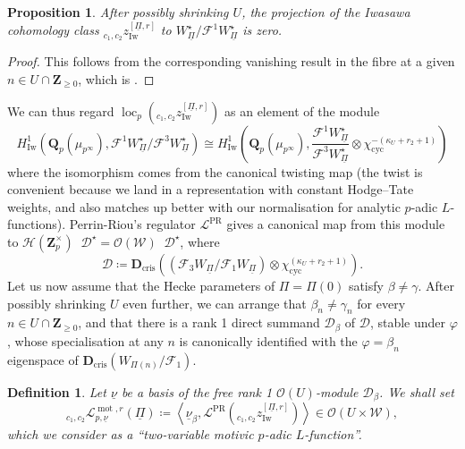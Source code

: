 \documentclass[cjm]{ipart}
\theoremstyle{plain}
\newtheorem{proposition}[theorem]{Proposition}
\newtheorem{definition}[theorem]{Definition}
\theoremstyle{remark}
\DeclareMathOperator{\Iw}{Iw}
\DeclareMathOperator{\loc}{loc}
\DeclareMathOperator{\mot}{mot}
\newcommand{\Dcris}{\mathbf{D}_{\mathrm{cris}}}
\newcommand{\QQ}{\mathbf{Q}}
\newcommand{\Qp}{\QQ_p}
\newcommand{\ZZ}{\mathbf{Z}}
\newcommand{\Zp}{\mathbf{Z}_p}
\newcommand{\cD}{\mathcal{D}}
\newcommand{\cH}{\mathcal{H}}
\newcommand{\cL}{\mathcal{L}}
\newcommand{\cO}{\mathcal{O}}
\newcommand{\cW}{\mathcal{W}}
\newcommand{\sF}{\mathscr{F}}
\newcommand{\uPi}{\underline{\Pi}}
\newcommand{\unu}{\underline{\nu}}
\numberwithin{equation}{subsection}
\renewcommand{\ge}{\geqslant}
\begin{document}
  \begin{proposition}
   After possibly shrinking $U$, the projection of the Iwasawa cohomology class ${}_{c_1, c_2} z^{[\uPi, r]}_{\Iw}$ to $W_{\uPi}^{\star} /\sF^1 W_{\uPi}^{\star}$ is zero.
  \end{proposition}

  \begin{proof}
   This follows from the corresponding vanishing result in the fibre at a given $n \in U \cap \ZZ_{\ge 0}$, which is \cite[Proposition 11.2.2]{LPSZ1}.
  \end{proof}

  We can thus regard $\loc_p\left({}_{c_1, c_2} z^{[\uPi, r]}_{\Iw}\right)$ as an element of the module
  \[
   H^1_{\Iw}\left(\Qp(\mu_{p^\infty}), {\sF^1 W_{\uPi}^{\star}} / {\sF^3 W_{\uPi}^{\star}}\right)
   \cong
   H^1_{\Iw}\left(\Qp(\mu_{p^\infty}), \frac{\sF^1 W_{\uPi}^{\star}} {\sF^3 W_{\uPi}^{\star}}\otimes \chi_{\mathrm{cyc}}^{-(\kappa_U + r_2 + 1)}\right)
  \]
  where the isomorphism comes from the canonical twisting map (the twist is convenient because we land in a representation with constant Hodge--Tate weights, and also matches up better with our normalisation for analytic $p$-adic $L$-functions).
  Perrin-Riou's regulator $\cL^{\mathrm{PR}}$ gives a canonical map from this module to $\cH(\Zp^\times) \mathop{\hat\otimes} \mathcal{D}^\star = \cO(\cW) \mathop{\hat\otimes} \mathcal{D}^\star$, where
   \[
   \mathcal{D} \coloneqq \Dcris\left( (\sF_3 W_{\uPi} / \sF_1 W_{\uPi}) \otimes \chi_{\mathrm{cyc}}^{(\kappa_U + r_2 + 1)}\right).
  \]
  Let us now assume that the Hecke parameters of $\Pi = \Pi(0)$ satisfy $\beta \ne \gamma$. After possibly shrinking $U$ even further, we can arrange that $\beta_n \ne \gamma_n$ for every $n \in U \cap \ZZ_{\ge 0}$, and that there is a rank 1 direct summand $\cD_\beta$ of $\cD$, stable under $\varphi$, whose specialisation at any $n$ is canonically identified with the $\varphi = \beta_n$ eigenspace of $\Dcris(W_{\Pi(n)} / \sF_1)$.

  \begin{definition}
   \label{def:motivicL}
   Let $\unu$ be a basis of the free rank 1 $\cO(U)$-module $\cD_\beta$. We shall set
   \[ {}_{c_1, c_2} \cL^{\mot, r}_{p, \unu}(\uPi) \coloneqq \left\langle\unu_\beta, \cL^{\mathrm{PR}}\left({}_{c_1, c_2} z^{[\uPi, r]}_{\Iw}\right) \right\rangle \in \cO(U \times \cW),
   \]
   which we consider as a ``two-variable motivic $p$-adic $L$-function''.
  \end{definition}
\end{document}
